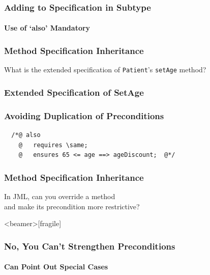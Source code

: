 \begin{frame}[fragile]
\frametitle{Adding to Specification in Subtype}
\framesubtitle{Use of `also' Mandatory}


\end{frame}

\begin{frame}
\frametitle{Method Specification Inheritance}

\begin{question}
What is the extended specification of \texttt{Patient}'s
\texttt{setAge} method?
\end{question}
\end{frame}

\begin{frame}[fragile]
\frametitle{Extended Specification of SetAge}


\end{frame}

\begin{frame}[fragile]
\frametitle{Avoiding Duplication of Preconditions}

\begin{lstlisting}
  /*@ also
    @   requires \same;
    @   ensures 65 <= age ==> ageDiscount;  @*/
\end{lstlisting}
\end{frame}

\begin{frame}
\frametitle{Method Specification Inheritance}
\begin{question}
In JML, can you override a method \\
and make its precondition more restrictive?
\end{question}
\end{frame}

\begin{frame}<beamer>[fragile]
\frametitle{No, You Can't Strengthen Preconditions}
\framesubtitle{Can Point Out Special Cases}



\end{frame}


